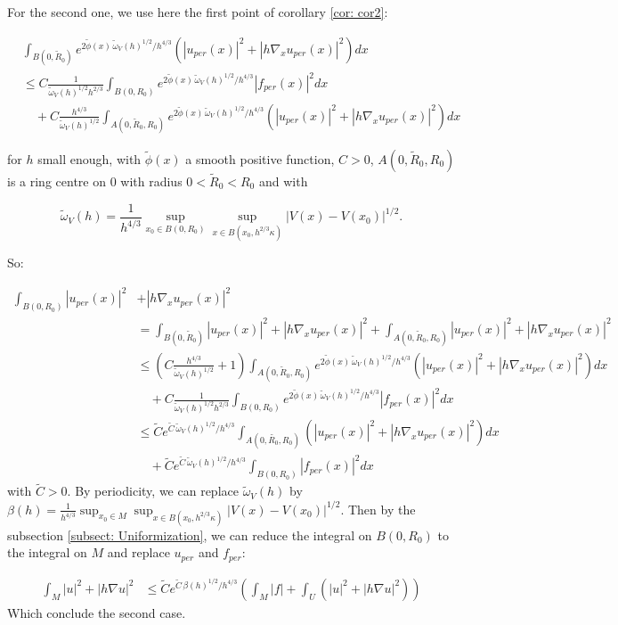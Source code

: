 \documentclass[leqno,11pt,letterpaper, english]{amsart}
\newcommand{\nn}{\nonumber}
\theoremstyle{plain}
\theoremstyle{definition}
\numberwithin{equation}{section}
\begin{document}
For the second one, we use here the first point of corollary \ref{cor: cor2}:

\begin{align}
       &\int_{B(0,\tilde{R}_0)} e^{2\tilde{\phi}(x)\,\tilde{\omega}_V(h)^{1/2}/ h^{4/3}} (|u_{per}(x)|^2 +|h\nabla_x u_{per}(x)|^2)dx\nn\\
    &\leq C \frac{1}{\tilde{\omega}_V(h)^{1/2}h^{2/3}}\int_{B(0,R_0)} e^{2\tilde{\phi}(x)\,\tilde{\omega}_V(h)^{1/2}/ h^{4/3}}|f_{per}(x)|^2dx\nn\\
    &\quad +C \frac{h^{4/3}}{\tilde{\omega}_V(h)^{1/2}}\int_{A(0,\tilde{R}_0,R_0)} e^{2\tilde{\phi}(x)\,\tilde{\omega}_V(h)^{1/2}/ h^{4/3}} (|u_{per}(x)|^2 +|h\nabla_x u_{per}(x)|^2)dx
\end{align}

for $h$ small enough, with $\tilde{\phi}(x)$ a smooth positive function, $C>0$, $A(0,\tilde{R}_0,R_0)$ is a ring centre on $0$ with radius $0<\tilde{R}_0<R_0$ and with

\begin{equation}
\tilde{\omega}_V(h)= \frac{1}{h^{4/3}}\sup_{x_0\in B(0,R_0)}\sup_{x\in B(x_0,h^{2/3}\kappa)}|V(x)-V(x_0)|^{1/2}.
\end{equation}

So:

\begin{align}
	\int_{B(0,R_0)}|u_{per}(x)|^2&+|h\nabla_x u_{per}(x)|^2\nn\\
	&=\int_{B(0,\tilde{R}_0)}|u_{per}(x)|^2+|h\nabla_x u_{per}(x)|^2+\int_{A(0,\tilde{R}_0,R_0)}|u_{per}(x)|^2+|h\nabla_x u_{per}(x)|^2\nn\\
	&\leq (C \frac{h^{4/3}}{\tilde{\omega}_V(h)^{1/2}}+1)\int_{A(0,\tilde{R}_0,R_0)} e^{2\tilde{\phi}(x)\,\tilde{\omega}_V(h)^{1/2}/ h^{4/3}} (|u_{per}(x)|^2 +|h\nabla_x u_{per}(x)|^2)dx\nn\\
	&\quad +C \frac{1}{\tilde{\omega}_V(h)^{1/2}h^{2/3}}\int_{B(0,R_0)} e^{2\tilde{\phi}(x)\,\tilde{\omega}_V(h)^{1/2}/ h^{4/3}}|f_{per}(x)|^2dx\nn\\
	& \leq \tilde{C} e^{\tilde{C}\,\tilde{\omega}_V(h)^{1/2}/ h^{4/3}}\int_{A(0,\tilde{R_0},R_0)} (|u_{per}(x)|^2 +|h\nabla_x u_{per}(x)|^2)dx\nn\\
	& \quad+\tilde{C} e^{\tilde{C}\,\tilde{\omega}_V(h)^{1/2}/ h^{4/3}}\int_{B(0,R_0)}|f_{per}(x)|^2dx
\end{align}
with $\tilde{C}>0$.
By periodicity, we can replace $\tilde{\omega}_V(h)$ by $\beta(h)= \frac{1}{h^{4/3}}\sup_{x_0\in M}\sup_{x\in B(x_0,h^{2/3}\kappa)}|V(x)-V(x_0)|^{1/2}$.
Then by the subsection \ref{subsect: Uniformization}, we can reduce the integral on $B(0,R_0)$ to the integral on $M$ and replace $u_{per}$ and $f_{per}$:

\begin{align}
\int_{M}|u|^2+|h\nabla u|^2&\leq \tilde{C} e^{\tilde{C}\,\beta(h)^{1/2}/ h^{4/3}}\left(\int_{M}|f|+\int_{U} (|u|^2 +|h\nabla u|^2)\right)
\end{align}
Which conclude the second case.

\typeout{}

\end{document}
